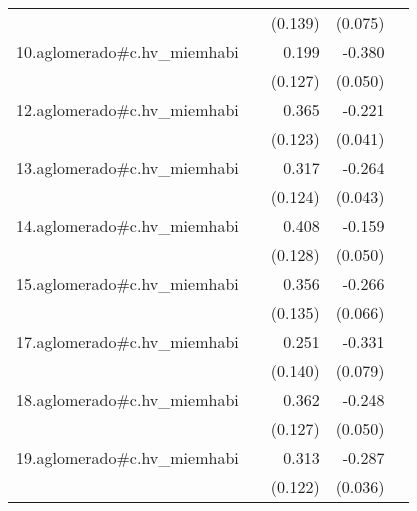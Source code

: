 {\begin{longtable}{l*{4}{D{.}{.}{-1}}}
            &                     &     (0.139)         &     (0.075)         &                     \\
\addlinespace
10.aglomerado#c.hv\_miemhabi&                     &       0.199         &      -0.380\sym{***}&                     \\
            &                     &     (0.127)         &     (0.050)         &                     \\
\addlinespace
12.aglomerado#c.hv\_miemhabi&                     &       0.365\sym{**} &      -0.221\sym{***}&                     \\
            &                     &     (0.123)         &     (0.041)         &                     \\
\addlinespace
13.aglomerado#c.hv\_miemhabi&                     &       0.317\sym{*}  &      -0.264\sym{***}&                     \\
            &                     &     (0.124)         &     (0.043)         &                     \\
\addlinespace
14.aglomerado#c.hv\_miemhabi&                     &       0.408\sym{**} &      -0.159\sym{**} &                     \\
            &                     &     (0.128)         &     (0.050)         &                     \\
\addlinespace
15.aglomerado#c.hv\_miemhabi&                     &       0.356\sym{**} &      -0.266\sym{***}&                     \\
            &                     &     (0.135)         &     (0.066)         &                     \\
\addlinespace
17.aglomerado#c.hv\_miemhabi&                     &       0.251         &      -0.331\sym{***}&                     \\
            &                     &     (0.140)         &     (0.079)         &                     \\
\addlinespace
18.aglomerado#c.hv\_miemhabi&                     &       0.362\sym{**} &      -0.248\sym{***}&                     \\
            &                     &     (0.127)         &     (0.050)         &                     \\
\addlinespace
19.aglomerado#c.hv\_miemhabi&                     &       0.313\sym{*}  &      -0.287\sym{***}&                     \\
            &                     &     (0.122)         &     (0.036)         &                     \\

\end{longtable}}
